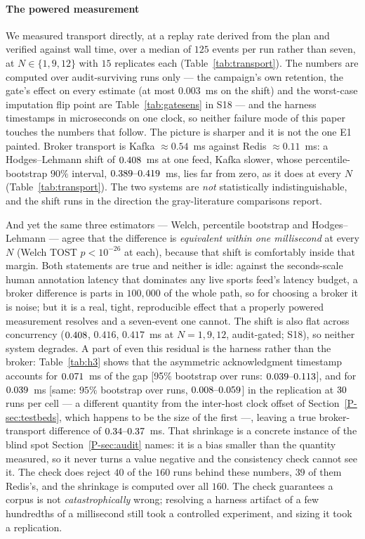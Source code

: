 \documentclass[10pt,journal,onecolumn]{IEEEtran}
\newcommand{\kafka}{Kafka}
\newcommand{\redis}{Redis}
\newcommand{\mainTestbeds}{\ref{P-sec:testbeds}}        %
\newcommand{\mainAudit}{\ref{P-sec:audit}}           %
\begin{document}
\paragraph{The powered measurement} We measured transport directly, at a replay rate
derived from the plan and verified against wall time, over a median of $125$ events per run rather
than seven, at $N \in \{1, 9, 12\}$ with $15$ replicates each (Table~\ref{tab:transport}).
The numbers are computed over audit-surviving runs only --- the campaign's own retention,
the gate's effect on every estimate (at most $0.003$~ms on the shift) and the worst-case
imputation flip point are Table~\ref{tab:gatesens} in S18 --- and the harness timestamps
in microseconds on one clock, so neither failure mode of this paper touches the numbers
that follow. The
picture is sharper and it is not the one E1 painted. Broker transport is \kafka{} $\approx
0.54$~ms against \redis{} $\approx 0.11$~ms: a Hodges--Lehmann shift of $0.408$~ms at one
feed, \kafka{} slower, whose percentile-bootstrap $90\%$ interval, $\tostHLCI$~ms, lies far from
zero, as it does at every $N$ (Table~\ref{tab:transport}).
The two systems are \emph{not} statistically indistinguishable, and the shift runs in the
direction the gray-literature comparisons report.

And yet the same three estimators --- Welch, percentile bootstrap and Hodges--Lehmann --- agree
that the difference is \emph{equivalent within one millisecond} at every $N$ (Welch TOST
$p < 10^{-26}$ at each), because that shift is comfortably inside that margin. Both statements are true and neither is idle: against the
seconds-scale human annotation latency that dominates any live sports feed's latency budget, a
broker difference is parts in $100{,}000$ of the whole path, so for choosing a broker it is noise; but it
is a real, tight, reproducible effect
that a properly powered measurement resolves and a seven-event one cannot. The shift is also flat
across concurrency ($0.408$, $0.416$, $0.417$~ms at $N = 1, 9, 12$, audit-gated;
S18), so neither system degrades.
A part of even this residual is the harness rather than the broker: Table~\ref{tab:h3} shows that
the asymmetric acknowledgment timestamp accounts for $0.071$~ms of the gap [95\%
bootstrap over runs: $\hThreeShrinkageCI$], and for $0.039$~ms
[same: $95\%$ bootstrap over runs, $\hThreeRepShrinkageCI$] in the replication at $30$ runs per cell --- a different
quantity from the inter-host clock offset of Section~\mainTestbeds{}, which happens to be the size
of the first ---, leaving a true broker-transport difference of $\hThreeResidualRange$~ms. That
shrinkage is a concrete instance of the blind spot Section~\mainAudit{} names: it is a bias smaller
than the quantity measured, so it never turns a value negative and the consistency check cannot
see it. The check does reject $40$ of the $160$ runs behind these numbers, $39$ of them
\redis{}'s, and the shrinkage is computed over all $160$. The check guarantees a corpus is not \emph{catastrophically} wrong;
resolving a harness artifact of a few hundredths of a millisecond still took a controlled
experiment, and sizing it took a replication.
\end{document}
